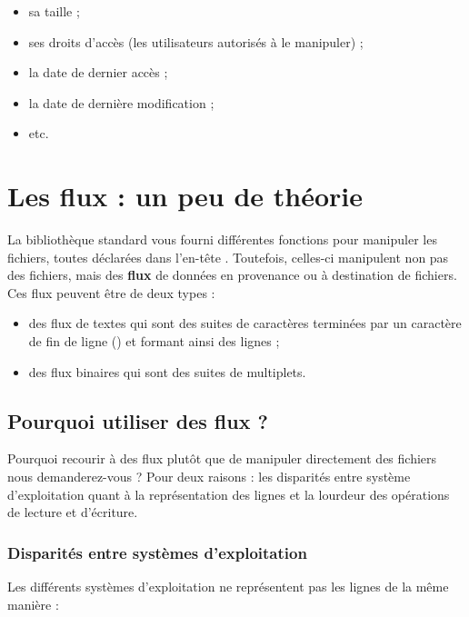 \begin{itemize}
\item
  sa taille ;
\item
  ses droits d'accès (les utilisateurs autorisés à le manipuler) ;
\item
  la date de dernier accès ;
\item
  la date de dernière modification ;
\item
  etc.
\end{itemize}

\section{Les flux : un peu de théorie}
\label{les-flux-:-un-peu-de-theorie}

La bibliothèque standard vous fourni différentes fonctions pour manipuler
les fichiers, toutes déclarées dans l'en-tête
. Toutefois, celles-ci
manipulent non pas des fichiers, mais des \textbf{flux} de données en
provenance ou à destination de fichiers. Ces flux peuvent être de deux
types :

\begin{itemize}
\item
  des flux de textes qui sont des suites de caractères terminées par un
  caractère de fin de ligne () et formant
  ainsi des lignes ;
\item
  des flux binaires qui sont des suites de multiplets.
\end{itemize}

\subsection{Pourquoi utiliser des flux ?}
\label{pourquoi-utiliser-des-flux-?}

Pourquoi recourir à des flux plutôt que de manipuler directement des
fichiers nous demanderez-vous ? Pour deux raisons : les disparités entre
système d'exploitation quant à la représentation des lignes et la
lourdeur des opérations de lecture et d'écriture.

\subsubsection{Disparités entre systèmes d'exploitation}
\label{disparites-entre-systemes-dexploitation}

Les différents systèmes d'exploitation ne représentent pas les lignes de
la même manière :

